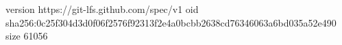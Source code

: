 version https://git-lfs.github.com/spec/v1
oid sha256:0c25f304d3d0f06f2576f92313f2e4a0bcbb2638cd76346063a6bd035a52e490
size 61056

